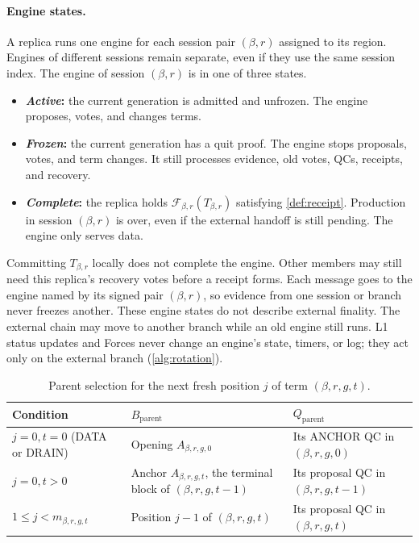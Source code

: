 \documentclass[11pt,a4paper]{article}
\newcommand{\FC}{\mathcal F}
\newcommand{\defterm}[1]{\textcolor{rrBlue}{\textit{#1}}}
\begin{document}
\paragraph{Engine states.}
A replica runs one engine for each session pair $(\beta,r)$ assigned to its region.
Engines of different sessions remain separate, even if they use the
same session index. The engine of
session $(\beta,r)$ is in one of three states.
\begin{itemize}
\item \textbf{\defterm{Active}:} the current generation is admitted and unfrozen.
The engine proposes, votes, and changes terms.
\item \textbf{\defterm{Frozen}:} the current generation has a quit proof. The
engine stops proposals, votes, and term changes. It still processes
evidence, old votes, QCs, receipts, and recovery.
\item \textbf{\defterm{Complete}:} the replica holds $\FC_{\beta,r}(T_{\beta,r})$ satisfying
\cref{def:receipt}.
Production in session $(\beta,r)$ is over, even if the external handoff is still
pending. The engine only serves data.
\end{itemize}
Committing $T_{\beta,r}$ locally does not complete the engine. Other members may
still need this replica's recovery votes before a receipt forms. Each
message goes to the engine named by its signed pair $(\beta,r)$, so
evidence from one session or branch never freezes another. These engine
states do not describe external finality. The external chain may move
to another branch while an old engine still runs. L1 status
updates and Forces never change an engine's state, timers, or log; they
act only on the external branch (\cref{alg:rotation}).

\begin{table}[htbp]\centering\small
\caption{Parent selection for the next fresh position $j$ of term $(\beta,r,g,t)$.}
\label{tab:parent}
\begin{tabularx}{\linewidth}{@{}l Y Y@{}}
\toprule
Condition & $B_{\mathrm{parent}}$ & $Q_{\mathrm{parent}}$\\
\midrule
$j=0,t=0$ (DATA or DRAIN) & Opening $A_{\beta,r,g,0}$ & Its ANCHOR QC in $(\beta,r,g,0)$\\
$j=0,t>0$ & Anchor $A_{\beta,r,g,t}$, the terminal block of $(\beta,r,g,t-1)$ & Its proposal QC in $(\beta,r,g,t-1)$\\
$1\le j<m_{\beta,r,g,t}$ & Position $j-1$ of $(\beta,r,g,t)$ & Its proposal QC in $(\beta,r,g,t)$\\
\bottomrule
\end{tabularx}
\end{table}
\end{document}
